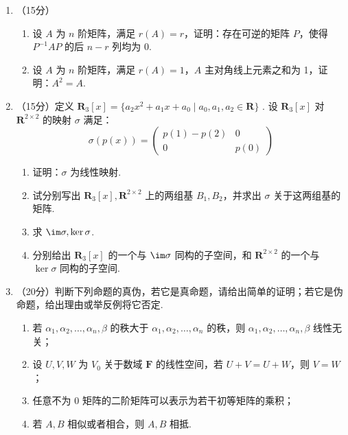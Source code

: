 \begin{enumerate}
    \item （15分）
    \begin{enumerate}
        \item 设 $A$ 为 $n$ 阶矩阵，满足 $r(A)=r$，证明：存在可逆的矩阵 $P$，使得 $P^{-1}AP$ 的后 $n-r$ 列均为 0.
        \item 设 $A$ 为 $n$ 阶矩阵，满足 $r(A)=1$，$A$ 主对角线上元素之和为 1，证明：$A^2=A$.
    \end{enumerate}

    \item （15分）定义 $\mathbf R_3[x]=\{a_2x^2+a_1x+a_0\mid a_0,a_1,a_2\in \mathbf R\}$ . 设 $\mathbf R_3[x]$ 对 $\mathbf R^{2\times 2}$ 的映射 $\sigma$ 满足：
    \[\sigma(p(x))=\begin{pmatrix}
    p(1)-p(2)&0\\
    0 & p(0)\end{pmatrix}\]

    \begin{enumerate}
        \item 证明：$\sigma$ 为线性映射.

        \item 试分别写出 $\mathbf R_3[x],\mathbf R^{2\times 2}$ 上的两组基 $B_1,B_2$，并求出 $\sigma$ 关于这两组基的矩阵.

        \item 求 $\im\sigma,\ker\sigma$.

        \item 分别给出 $\mathbf R_3[x]$ 的一个与 $\im\sigma$ 同构的子空间，和 $\mathbf R^{2\times 2}$ 的一个与 $\ker\sigma$ 同构的子空间.
    \end{enumerate}

    \item （20分）判断下列命题的真伪，若它是真命题，请给出简单的证明；若它是伪命题，给出理由或举反例将它否定.
    \begin{enumerate}
        \item 若 $\alpha_1,\alpha_2,\dots,\alpha_n,\beta$ 的秩大于 $\alpha_1,\alpha_2,\dots,\alpha_n$ 的秩，则 $\alpha_1,\alpha_2,\dots,\alpha_n,\beta$ 线性无关；

        \item 设 $U,V,W$ 为 $V_0$ 关于数域 $\mathbf{F}$ 的线性空间，若 $U+V=U+W$，则 $V=W$；

        \item 任意不为 0 矩阵的二阶矩阵可以表示为若干初等矩阵的乘积；

        \item 若 $A,B$ 相似或者相合，则 $A,B$ 相抵.
    \end{enumerate}
\end{enumerate}

\clearpage
